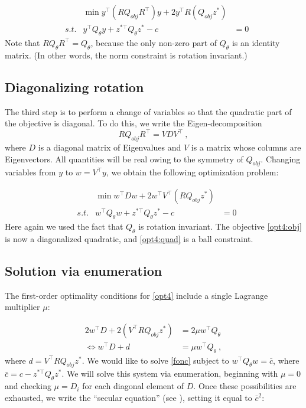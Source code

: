 \documentclass[conference]{IEEEtran}
\begin{document}
\begin{subequations}\label{opt3}
\begin{align}
\label{opt3:obj} && \min y^\top (RQ_{obj}R^\top) y + 2y^\top R(Q_{obj}z^*) &\\
\label{opt3:quad} & s.t. & y^\top Q_{\theta} y + z^{*\top}Q_\theta z^* - c &= 0
\end{align}
\end{subequations}
Note that $RQ_\theta R^\top = Q_\theta$, because the only non-zero part of $Q_\theta$ is an identity matrix. (In other words, the norm constraint is rotation invariant.)

\subsection{Diagonalizing rotation}

The third step is to perform a change of variables so that the quadratic part of the objective is diagonal. To do this, we write the Eigen-decomposition $$RQ_{obj}R^\top = VDV^\top~,$$ where $D$ is a diagonal matrix of Eigenvalues and $V$ is a matrix whose columns are Eigenvectors. All quantities will be real owing to the symmetry of $Q_{obj}$. Changing variables from $y$ to $w=V^\top y$, we obtain the following optimization problem:

\begin{subequations}\label{opt4}
\begin{align}
\label{opt4:obj} && \min w^\top D w + 2w^\top V^\top (RQ_{obj}z^*) &\\
\label{opt4:quad} & s.t. & w^\top Q_{\theta} w + z^{*\top}Q_\theta z^* - c &= 0
\end{align}
\end{subequations}
Here again we used the fact that $Q_\theta$ is rotation invariant. The objective \eqref{opt4:obj} is now a diagonalized quadratic, and \eqref{opt4:quad} is a ball constraint.

\subsection{Solution via enumeration}
 
The first-order optimality conditions for \eqref{opt4} include a single Lagrange multiplier $\mu$:

\begin{align}\label{fonc}
2w^\top D + 2(V^\top R Q_{obj}z^*) &= 2\mu w^\top Q_\theta \\
\iff w^\top D + d &= \mu w^\top Q_\theta~,
\end{align}
where $d = V^\top R Q_{obj}z^*$. We would like to solve \eqref{fonc} subject to $w^\top Q_\theta w = \bar{c}$, where $\bar{c} = c -  z^{*\top}Q_\theta z^*$. We will solve this system via enumeration, beginning with $\mu=0$ and checking $\mu=D_i$ for each diagonal element of $D$. Once these possibilities are exhausted, we write the ``secular equation'' (see \cite{bienstock2014}), setting it equal to $\bar{c}^2$:
\end{document}
